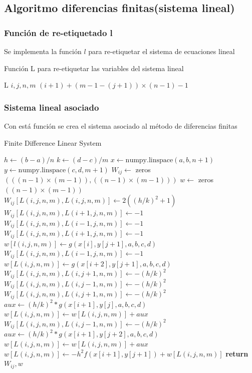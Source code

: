 \documentclass[a4paper]{article}
\begin{document}
\subsection{Algoritmo diferencias finitas(sistema lineal)}
\subsubsection{Función de re-etiquetado l}
Se implementa la función $l$ para re-etiquetar el sistema de ecuaciones lineal
\begin{algorithm}[H]
\caption{Función L para re-etiquetar las variables del sistema lineal}\label{alg::funcL}
\begin{algorithmic}[H]
\Function L {$i, j, n, m$}
\State \Return $(i+1) + (m-1-(j+1)) \times (n-1) - 1$
\EndFunction
\end{algorithmic}
\end{algorithm}
\subsubsection{Sistema lineal asociado}
Con está función se crea el sistema asociado al método de diferencias finitas
\begin{algorithm}[H]
\caption{Finite Difference Linear System}\label{alg::finite_difference}
\begin{algorithmic}[H]
\State $h \gets (b-a)/n$
\State $k \gets (d-c)/m$
\State $x \gets \text{numpy.linspace}(a, b, n+1)$
\State $y \gets \text{numpy.linspace}(c, d, m+1)$
\State $W_{ij} \gets$ zeros $(((n-1)\times(m-1)),((n-1)\times(m-1)))$
\State $w \gets$ zeros $((n-1)\times(m-1))$
\State $W_{ij}[L(i,j,n,m), L(i,j,n,m)] \gets 2((h/k)^2 + 1)$
\State $W_{ij}[L(i,j,n,m), L(i+1,j,n,m)] \gets -1$
\State $W_{ij}[L(i,j,n,m), L(i-1,j,n,m)] \gets -1$
\Else
{}
\State $W_{ij}[L(i,j,n,m), L(i+1,j,n,m)] \gets -1$
\State $w[l(i,j,n,m)] \gets g(x[i], y[j+1], a, b, c, d)$
\EndIf
{}
\State $W_{ij}[L(i,j,n,m), L(i-1,j,n,m)] \gets -1$
\State $w[L(i,j,n,m)] \gets g(x[i+2], y[j+1], a, b, c, d)$
\EndIf
\EndIf
{}
\State $W_{ij}[L(i,j,n,m), L(i,j+1,n,m)] \gets-(h/k)^2$
\State $W_{ij}[L(i,j,n,m), L(i,j-1,n,m)] \gets-(h/k)^2$
\Else
{}
\State $W_{ij}[L(i,j,n,m), L(i,j+1,n,m)] \gets -(h/k)^2$
\State $aux\gets (h/k)^2*g(x[i+1],y[j],a,b,c,d)$
\State $w[L(i,j,n,m)] \gets w[L(i,j,n,m)]+ aux$
\EndIf
{}
\State $W_{ij}[L(i,j,n,m), L(i,j-1,n,m)] \gets -(h/k)^2$
\State $aux\gets (h/k)^2*g(x[i+1],y[j+2],a,b,c,d)$
\State $w[L(i,j,n,m)] \gets w[L(i,j,n,m)]+ aux$
\EndIf
\EndIf
\State $w[L(i,j,n,m)] \gets-h^2f(x[i+1],y[j+1])+w[L(i,j,n,m)]$
\EndFor
\EndFor
\State \textbf{return} $W_{ij}, w$
\EndFunction
\end{algorithmic}
\end{algorithm}
\end{document}
